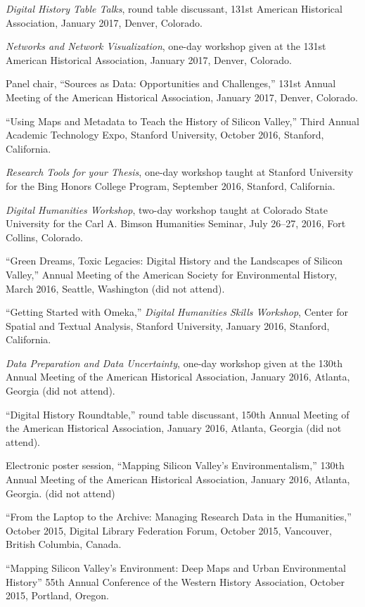 \emph{Digital History Table Talks}, round table discussant, 131st
American Historical Association, January 2017, Denver, Colorado.

\emph{Networks and Network Visualization}, one-day workshop given at the
131st American Historical Association, January 2017, Denver, Colorado.

Panel chair, ``Sources as Data: Opportunities and Challenges,'' 131st
Annual Meeting of the American Historical Association, January 2017,
Denver, Colorado.

``Using Maps and Metadata to Teach the History of Silicon Valley,''
Third Annual Academic Technology Expo, Stanford University, October
2016, Stanford, California.

\emph{Research Tools for your Thesis}, one-day workshop taught at
Stanford University for the Bing Honors College Program, September 2016,
Stanford, California.

\emph{Digital Humanities Workshop}, two-day workshop taught at Colorado
State University for the Carl A. Bimson Humanities Seminar, July 26--27,
2016, Fort Collins, Colorado.

``Green Dreams, Toxic Legacies: Digital History and the Landscapes of
Silicon Valley,'' Annual Meeting of the American Society for
Environmental History, March 2016, Seattle, Washington (did not attend).

``Getting Started with Omeka,'' \emph{Digital Humanities Skills
Workshop}, Center for Spatial and Textual Analysis, Stanford University,
January 2016, Stanford, California.

\emph{Data Preparation and Data Uncertainty}, one-day workshop given at
the 130th Annual Meeting of the American Historical Association, January
2016, Atlanta, Georgia (did not attend).

``Digital History Roundtable,'' round table discussant, 150th Annual
Meeting of the American Historical Association, January 2016, Atlanta,
Georgia (did not attend).

Electronic poster session, ``Mapping Silicon Valley's
Environmentalism,'' 130th Annual Meeting of the American Historical
Association, January 2016, Atlanta, Georgia. (did not attend)

``From the Laptop to the Archive: Managing Research Data in the
Humanities,'' October 2015, Digital Library Federation Forum, October
2015, Vancouver, British Columbia, Canada.

``Mapping Silicon Valley's Environment: Deep Maps and Urban
Environmental History'' 55th Annual Conference of the Western History
Association, October 2015, Portland, Oregon.

